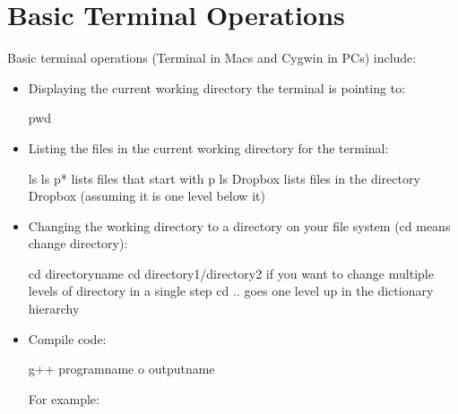 \documentclass[letterpaper,10pt,english]{sphinxmanual}
\begin{document}
\section{Basic Terminal Operations}
\label{\detokenize{lecture_notes/transition:basic-terminal-operations}}
Basic terminal operations (Terminal in Macs and Cygwin in PCs) include:
\begin{itemize}
\item {} 
Displaying the current working directory the terminal is pointing
to:

%
\begin{sphinxVerbatim}[commandchars=\\\{\}]
\PYGZdl{} pwd
\end{sphinxVerbatim}

\item {} 
Listing the files in the current working directory for the
terminal:

%
\begin{sphinxVerbatim}[commandchars=\\\{\}]
\PYGZdl{} ls
\PYGZdl{} ls p*   \PYGZsh{}\PYGZsh{}lists files that start with p
\PYGZdl{} ls Dropbox   \PYGZsh{}\PYGZsh{} lists files in the directory Dropbox
             \PYGZsh{}\PYGZsh{} (assuming it is one level below it)
\end{sphinxVerbatim}

\item {} 
Changing the working directory to a directory on your file system
(cd means change directory):

%
\begin{sphinxVerbatim}[commandchars=\\\{\}]
\PYGZdl{} cd directory\PYGZus{}name
\PYGZdl{} cd directory1/directory2   \PYGZsh{}\PYGZsh{} if you want to change multiple
                           \PYGZsh{}\PYGZsh{} levels of directory in a single step
\PYGZdl{} cd ..  \PYGZsh{}\PYGZsh{} goes one level up in the dictionary hierarchy
\end{sphinxVerbatim}

\item {} 
Compile code:

%
\begin{sphinxVerbatim}[commandchars=\\\{\}]
\PYGZdl{} g++ programname \PYGZhy{}o outputname
\end{sphinxVerbatim}

For example:


\end{itemize}
\end{document}
